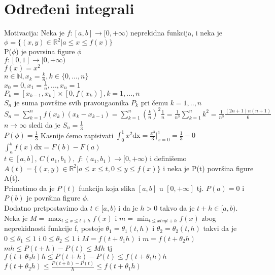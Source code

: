 \documentclass{article}
\begin{document}
\section{Određeni integrali}
Motivacija: Neka je $f: [a,b] \longrightarrow [0, +\infty)$ neprekidna funkcija, i neka je $\phi = \{ (x, y) \in \mathbb{R}^2 | a \leq x \leq f(x)\}$\\
P($\phi$) je povrsina figure $\phi$\\
$f: [0, 1] \longrightarrow [0, +\infty)$\\
$f(x) = x^2$\\
$n \in \mathbb{N}, x_k = \frac{k}{n}, k \in \{0, ..., n\}$\\
$x_0 = 0, x_1 = \frac{1}{n}, ..., x_n = 1$\\
$P_k = [x_{k-1}, x_k]\times [0, f(x_k)], k=1,...,n$\\
$S_n$ je suma površine svih pravougaonika $P_k$ pri čemu $k = 1,.., n$\\
$\displaystyle S_n = \sum_{k=1}^{n} f(x_k)(x_k - x_{k-1}) = \sum_{k=1}^{n} (\frac{k}{n})^2\frac{1}{n} = \frac{1}{n^3}\sum_{k=1}^n k^2 = \frac{1}{n^3}\frac{(2n+1)n(n+1)}{6}$\\
$n\longrightarrow\infty$ sledi da je $S_n = \frac{1}{3}$\\
$P(\phi) = \frac{1}{3}$ Kasnije ćemo zapisivati $\displaystyle \int_0^1 x^2\text{dx} = \frac{x^3}{3} \Bigg|^1_{x=0} = \frac{1}{3} - 0$\\
$\displaystyle \int^b_a f(x)\text{dx} = F(b) - F(a)$\\
$t \in [a, b],\ C(a_1, b_1),\ f: (a_1, b_1) \longrightarrow [0, +\infty)$ i definišemo $A(t) = \{(x, y) \in \mathbb{R}^2 | a\leq x \leq t, 0\leq y \leq f(x)\}$ i neka je P(t) površina figure A(t).\\
Primetimo da je $P(t)$ funkcija koja slika $[a, b]$ u $[0, +\infty]$ tj. $P(a) = 0$ i $P(b)$ je površina figure $\phi$.\\
Dodatno pretpostavimo da $t \in [a, b)$ i da je $h > 0$ takvo da je $t + h \in [a, b)$.\\
Neka je $\displaystyle M = \max_{t\leq x\leq t+ h} f(x)$ i $m = \min_{t \leq x leq t+h} f(x)$ zbog neprekidnosti funkcije f, postoje $\theta_1 = \theta_1(t, h)$ i $\theta_2 = \theta_2(t, h)$ takvi da je $0\leq \theta_1 \leq 1$ i $0\leq \theta_2 \leq 1$ i $M = f(t + \theta_1h)$ i $m = f(t + \theta_2h)$\\
$m h \leq P(t + h) - P(t) \leq M h$ tj $f(t + \theta_2h)h \leq P(t+h) - P(t) \leq f(t + \theta_1h)h$\\
$f(t+\theta_2h) \leq \frac{P(t + h) - P(t)}{h}\leq f(t+\theta_1h)$\\
\end{document}
